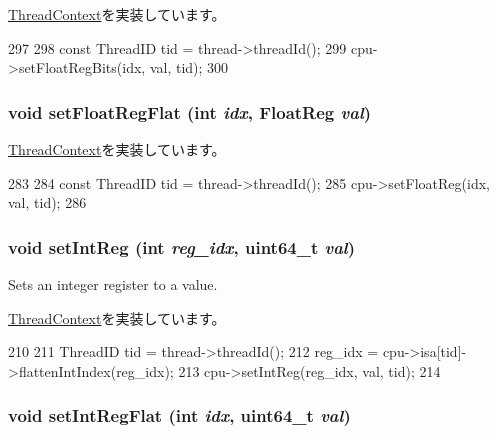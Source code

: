 \hyperlink{classThreadContext_a2964ca7e974bf80017ee30d832b32a35}{ThreadContext}を実装しています。


\begin{DoxyCode}
297 {
298     const ThreadID tid = thread->threadId();
299     cpu->setFloatRegBits(idx, val, tid);
300 }
\end{DoxyCode}
\hypertarget{classInOrderThreadContext_a71ec23ca2c029120932e5af4babc0da1}{
\subsubsection[{setFloatRegFlat}]{\setlength{\rightskip}{0pt plus 5cm}void setFloatRegFlat (int {\em idx}, \/  {\bf FloatReg} {\em val})}}
\label{classInOrderThreadContext_a71ec23ca2c029120932e5af4babc0da1}


\hyperlink{classThreadContext_a01392cdc362f9d589f90e57bcc519623}{ThreadContext}を実装しています。


\begin{DoxyCode}
283 {
284     const ThreadID tid = thread->threadId();
285     cpu->setFloatReg(idx, val, tid);
286 }
\end{DoxyCode}
\hypertarget{classInOrderThreadContext_abc264e8ee37c6bd7d7b5759b97c34356}{
\subsubsection[{setIntReg}]{\setlength{\rightskip}{0pt plus 5cm}void setIntReg (int {\em reg\_\-idx}, \/  uint64\_\-t {\em val})}}
\label{classInOrderThreadContext_abc264e8ee37c6bd7d7b5759b97c34356}
Sets an integer register to a value. 

\hyperlink{classThreadContext_a995ac11ab79af59e135d473df10c72da}{ThreadContext}を実装しています。


\begin{DoxyCode}
210 {
211     ThreadID tid = thread->threadId();
212     reg_idx = cpu->isa[tid]->flattenIntIndex(reg_idx);
213     cpu->setIntReg(reg_idx, val, tid);
214 }
\end{DoxyCode}
\hypertarget{classInOrderThreadContext_ae3b8c9c2c1ae95767f0703357957a3f8}{
\subsubsection[{setIntRegFlat}]{\setlength{\rightskip}{0pt plus 5cm}void setIntRegFlat (int {\em idx}, \/  uint64\_\-t {\em val})}}
\label{classInOrderThreadContext_ae3b8c9c2c1ae95767f0703357957a3f8}


